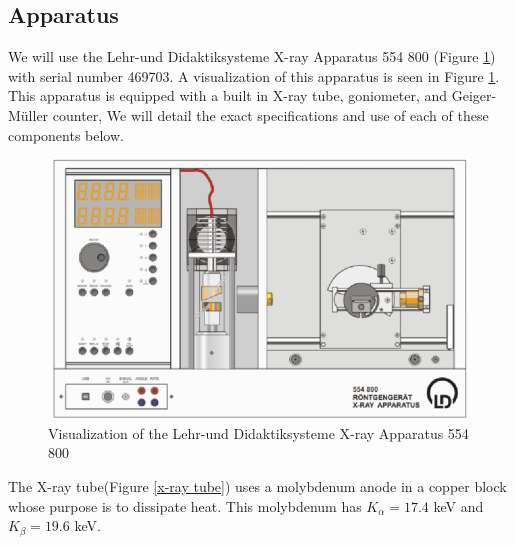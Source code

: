 \documentclass[twocolumn]{article}
\begin{document}
		\subsection{Apparatus}
		We will use the Lehr-und Didaktiksysteme X-ray Apparatus 554 800 (Figure \ref{apparatus}) with serial number 469703. A visualization of this apparatus is seen in Figure \ref{apparatus}. This apparatus is equipped with a built in X-ray tube, goniometer, and Geiger-M\"uller counter, We will detail the exact specifications and use of each of these components below.
		\begin{figure}[h!]
			\begin{center}
				\includegraphics[width = .45\textwidth]{apparatus}
			\end{center}
			\caption{Visualization of the Lehr-und Didaktiksysteme X-ray Apparatus 554 800}
			\label{apparatus}
		\end{figure}
			The X-ray tube(Figure \ref{x-ray tube}) uses a molybdenum anode in a copper block whose purpose is to dissipate heat. This molybdenum has $K_\alpha = 17.4$ keV and $K_\beta = 19.6$ keV.
\end{document}
